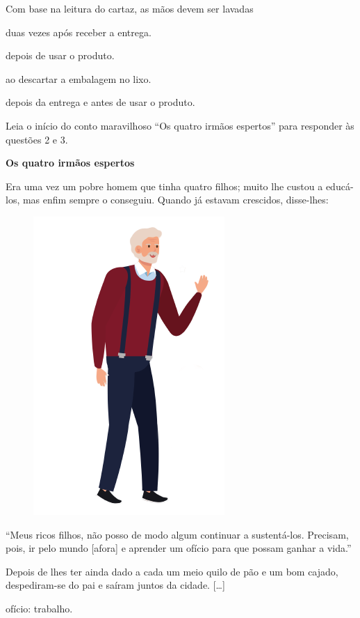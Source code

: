Com base na leitura do cartaz, as mãos devem ser lavadas

\begin{escolha}
\item duas vezes após receber a entrega.

\item depois de usar o produto.

\item ao descartar a embalagem no lixo.

\item depois da entrega e antes de usar o produto.
\end{escolha}

Leia o início do conto maravilhoso ``Os quatro irmãos espertos'' para responder às questões 2 e 3.

\begin{myquote}
\textbf{Os quatro irmãos espertos}

Era uma vez um pobre homem que tinha quatro filhos; muito lhe custou a
educá-los, mas enfim sempre o conseguiu. Quando já estavam crescidos,
disse-lhes:

\begin{figure}
\includegraphics[width=.4\textwidth]{./media/image23x.png}
\end{figure}

``Meus ricos filhos, não posso de modo algum continuar a sustentá-los.
Precisam, pois, ir pelo mundo [afora] e aprender um ofício para que possam
ganhar a vida.''

Depois de lhes ter ainda dado a cada um meio quilo de pão e um bom
cajado, despediram-se do pai e saíram juntos da cidade. {[}\ldots{}{]}


\begin{flushright}
\begin{small}
 ofício: trabalho.
\end{small}
\end{flushright}
\end{myquote}

